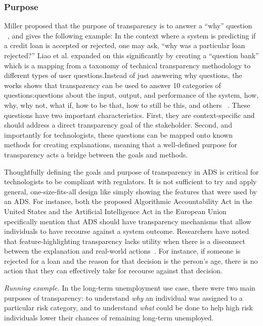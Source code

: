 \documentclass[sigconf, nonacm]{acmart}
\begin{document}
\subsubsection{Purpose} \label{purpose}Miller proposed that the purpose of transparency is to answer a ``why'' question ~\cite{DBLP:journals/corr/Miller17a}, and gives the following example: In the context where a system is predicting if a credit loan is accepted or rejected, one may ask, ``why was a particular loan rejected?'' Liao et al. expanded on this significantly by creating a ``question bank'' which is a mapping from a taxonomy of technical transparency methodology to different types of user questions.Instead of just answering why questions, the works shows that transparency can be used to answer 10 categories of questions:questions about the input, output, and performance of the system, how, why, why not, what if, how to be that, how to still be this, and others ~\cite{DBLP:conf/chi/LiaoGM20}. These questions have two important characteristics. First, they are context-specific and should address a direct transparency goal of the stakeholder. Second, and importantly for technologists, these questions can be mapped onto known methods for creating explanations, meaning that a well-defined purpose for transparency acts a bridge between the goals and methods.

Thoughtfully defining the goals and purpose of transparency in ADS is critical for technologists to be compliant with regulators. It is not sufficient to try and apply general, one-size-fits-all design like simply showing the features that were used by an ADS. For instance, both the proposed Algorithmic Accountability Act in the United States and the Artificial Intelligence Act in the European Union specifically mention that ADS should have transparency mechanisms that allow individuals to have recourse against a system outcome. Researchers have noted that feature-highlighting transparency lacks utility when there is a disconnect between the explanation and real-world actions~\cite{barocas2020hidden}. For instance, if someone is rejected for a loan and the reason for that decision is the person's age, there is no action that they can effectively take for recourse against that decision.

\emph{Running example.} In the long-term unemployment use case, there were two main purposes of transparency: to understand \emph{why} an individual was assigned to a particular risk category, and to understand \emph{what} could be done to help high risk individuals lower their chances of remaining long-term unemployed.
\end{document}
